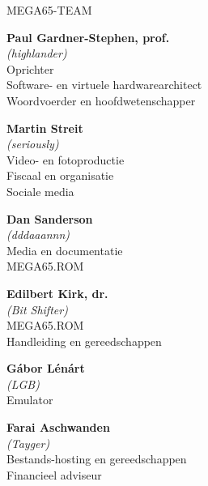 \newpage
{\huge MEGA65-TEAM}\vspace{1cm}

\begin{mega65thanks}

\begin{minipage}{\linewidth}
    {\large\bf Paul Gardner-Stephen, prof.} \\
    \textit{(highlander)} \\
    Oprichter \\
    Software- en virtuele hardwarearchitect \\
    Woordvoerder en hoofdwetenschapper
\end{minipage}

\begin{minipage}{\linewidth}
    {\large\bf Martin Streit} \\
    \textit{(seriously)} \\
    Video- en fotoproductie \\
    Fiscaal en organisatie \\
    Sociale media
\end{minipage}

\begin{minipage}{\linewidth}
    {\large\bf Dan Sanderson} \\
    \textit{(dddaaannn)} \\
    Media en documentatie \\
    MEGA65.ROM
\end{minipage}

\begin{minipage}{\linewidth}
    {\large\bf Edilbert Kirk, dr.} \\
    \textit{(Bit Shifter)} \\
    MEGA65.ROM \\
    Handleiding en gereedschappen
\end{minipage}

\begin{minipage}{\linewidth}
    {\large\bf Gábor Lénárt} \\
    \textit{(LGB)} \\
    Emulator
\end{minipage}

\begin{minipage}{\linewidth}
    {\large\bf Farai Aschwanden} \\
    \textit{(Tayger)} \\
    Bestands-hosting en gereedschappen \\
    Financieel adviseur
\end{minipage}


\end{mega65thanks}
